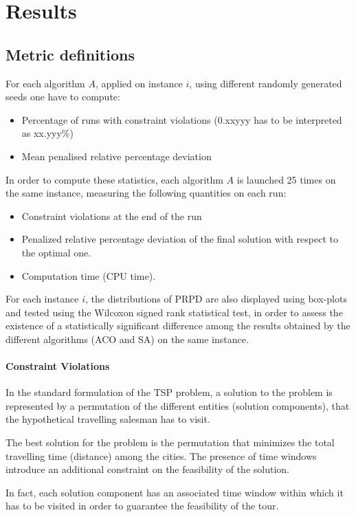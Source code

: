 \section{Results} \label{results}
\subsection{Metric definitions}\label{subsec:metric}
For each algorithm $A$, applied on instance $i$, using different randomly generated seeds one have to compute:
\begin{itemize}
  \item  Percentage of runs with constraint violations (0.xxyyy has to be interpreted as xx.yyy\%)
  \item  Mean penalised relative percentage deviation
\end{itemize}

In order to compute these statistics, each algorithm $A$ is launched 25 times on the same instance, measuring the following quantities on each run:
\begin{itemize}
  \item Constraint violations at the end of the run  
  \item Penalized relative percentage deviation of the final solution with respect to the optimal one.
  \item Computation time (CPU time).
\end{itemize}

For each instance $i$, the distributions of PRPD are also displayed using box-plots and tested using the Wilcoxon signed rank statistical test, in order to assess the existence of a statistically significant difference among the results obtained by the different algorithms (ACO and SA) on the same instance. 

\paragraph{Constraint Violations}
In the standard formulation of the TSP problem, a solution to the problem is represented by a permutation of the different
entities (solution components), that the hypothetical travelling salesman has to visit.

The best solution for the problem is the permutation that minimizes the total travelling time (distance) among the cities.
The presence of time windows introduce an additional constraint on the feasibility of the solution.

In fact, each solution component has an associated time window within which it has to be visited in order to guarantee the feasibility of the tour.

